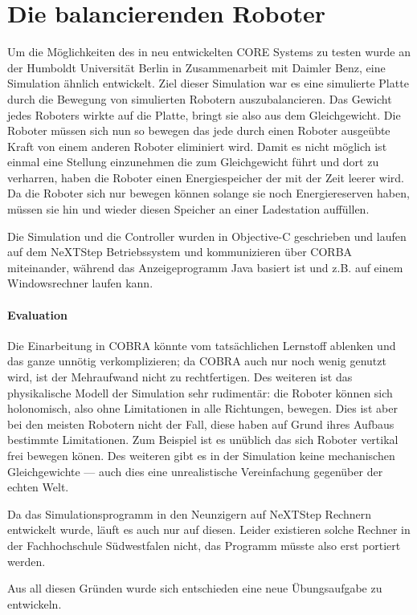 \clearpage
\section{Die balancierenden Roboter}
Um die M{\"{o}}glichkeiten des in \cite{Werner00} neu entwickelten CORE Systems zu testen wurde an der Humboldt Universit{\"{a}}t Berlin in Zusammenarbeit
mit Daimler Benz, eine Simulation {\"{a}}hnlich entwickelt. Ziel dieser Simulation war es eine simulierte Platte durch die Bewegung von simulierten
Robotern auszubalancieren. Das Gewicht jedes Roboters wirkte auf die Platte, bringt sie also aus dem Gleichgewicht. Die Roboter m{\"{u}}ssen sich nun so
bewegen das jede durch einen Roboter ausge{\"{u}}bte Kraft von einem anderen Roboter eliminiert wird. Damit es nicht m{\"{o}}glich ist einmal eine Stellung einzunehmen
die zum Gleichgewicht f{\"{u}}hrt und dort zu verharren, haben die Roboter einen Energiespeicher der mit der Zeit leerer wird. Da die Roboter sich nur bewegen k{\"{o}}nnen
solange sie noch Energiereserven haben, m{\"{u}}ssen sie hin und wieder diesen Speicher an einer Ladestation auff{\"{u}}llen.

Die Simulation und die Controller wurden in Objective-C geschrieben und laufen auf dem NeXTStep Betriebssystem und kommunizieren {\"{u}}ber CORBA miteinander\cite{predictablecorba},
w{\"{a}}hrend das Anzeigeprogramm Java basiert ist und z.B. auf einem Windowsrechner laufen kann.

\paragraph{Evaluation} Die Einarbeitung in COBRA k{\"{o}}nnte vom tats{\"{a}}chlichen Lernstoff ablenken und das ganze unn{\"{o}}tig verkomplizieren; da COBRA auch nur noch
wenig genutzt wird, ist der Mehraufwand nicht zu rechtfertigen. Des weiteren ist das physikalische Modell der Simulation sehr rudiment{\"{a}}r:
die Roboter k{\"{o}}nnen sich holonomisch, also ohne Limitationen in alle Richtungen, bewegen. Dies ist aber bei den meisten Robotern nicht
der Fall, diese haben auf Grund ihres Aufbaus bestimmte Limitationen. Zum Beispiel ist es un{\"{u}}blich das sich Roboter vertikal frei bewegen k{\"{o}}nen. Des weiteren
gibt es in der Simulation keine mechanischen Gleichgewichte --- auch dies eine unrealistische Vereinfachung gegen{\"{u}}ber der echten Welt.

Da das Simulationsprogramm in den Neunzigern auf NeXTStep Rechnern entwickelt wurde, l{\"{a}}uft es auch nur auf diesen. Leider existieren solche Rechner in der Fachhochschule
S{\"{u}}dwestfalen nicht, das Programm m{\"{u}}sste also erst portiert werden.

Aus all diesen Gr{\"{u}}nden wurde sich entschieden eine neue {\"{U}}bungsaufgabe zu entwickeln.

